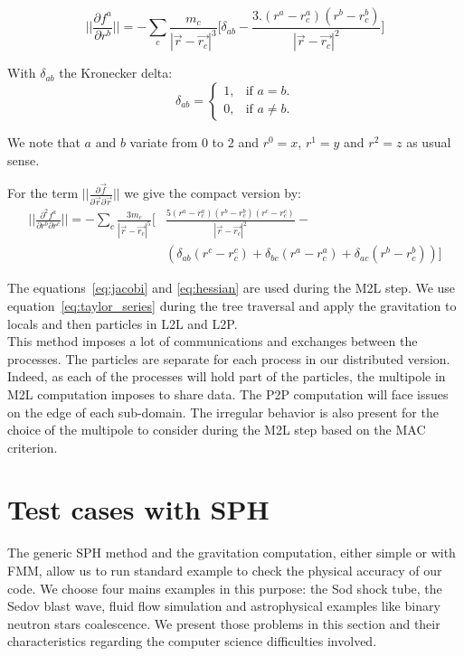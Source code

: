 \begin{equation}
 ||\frac{\partial f^a}{\partial r^b}|| = -\sum_c \frac{m_c}{|\vec{r}-\vec{r_c}|^3} \Big[ \delta_{ab} - \frac{3.(r^a-r_c^a)(r^b-r_c^b)}{|\vec{r}-\vec{r_c}|^2} \Big] 
 \label{eq:jacobi}
\end{equation}

With $\delta_{ab}$ the Kronecker delta:
\begin{equation}
\delta_{ab} = 
\begin{cases}
    1, & \text{if $a = b$}.\\
    0, & \text{if $a\neq b$}.
  \end{cases}
\end{equation}

We note that $a$ and $b$ variate from 0 to 2 and $r^0=x$, $r^1=y$ and $r^2=z$ as usual sense. 

For the term $||\frac{\partial\vec{f}}{\partial\vec{r} \partial\vec{r}}||$ we give the compact version by:
\begin{equation}
\begin{aligned}
||\frac{\partial^2 f^a}{\partial r^b \partial r^c}|| = - \sum_c \frac{3 m_c}{|\vec{r}-\vec{r_c}|^5} \Big[ & \frac{5(r^a-r_c^a)(r^b-r_c^b)(r^c-r_c^c)}{|\vec{r}-\vec{r_c}|^2} - \\ 
		 & \left( \delta_{ab} (r^c-r_c^c)+\delta_{bc} (r^a-r_c^a)+\delta_{ac} (r^b-r_c^b) \right) \Big] 
\end{aligned}
\label{eq:hessian}
\end{equation} 

The equations~\ref{eq:jacobi} and \ref{eq:hessian} are used during the M2L step. 
We use equation~\ref{eq:taylor_series} during the tree traversal and apply the gravitation to locals and then particles in L2L and L2P.\\

This method imposes a lot of communications and exchanges between the processes. 
The particles are separate for each process in our distributed version.
Indeed, as each of the processes will hold part of the particles, the multipole in M2L computation imposes to share data. 
The P2P computation will face issues on the edge of each sub-domain. 
The irregular behavior is also present for the choice of the multipole to consider during the M2L step based on the MAC criterion.

\section{Test cases with SPH} 
\label{sec:applications}
The generic SPH method and the gravitation computation, either simple or with FMM, allow us to run standard example to check the physical accuracy of our code. 
We choose four mains examples in this purpose: the Sod shock tube, the Sedov blast wave, fluid flow simulation and astrophysical examples like binary neutron stars coalescence.
We present those problems in this section and their characteristics regarding the computer science difficulties involved. 


